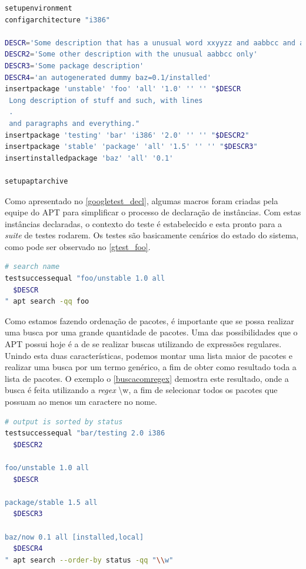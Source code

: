 \begin{lstlisting}[language=Bash,label=googletest_decl,caption={Declarações de instâncias para o teste}]
setupenvironment
configarchitecture "i386"

DESCR='Some description that has a unusual word xxyyzz and aabbcc and a UPPERCASE'
DESCR2='Some other description with the unusual aabbcc only'
DESCR3='Some package description'
DESCR4='an autogenerated dummy baz=0.1/installed'
insertpackage 'unstable' 'foo' 'all' '1.0' '' '' "$DESCR
 Long description of stuff and such, with lines
 .
 and paragraphs and everything."
insertpackage 'testing' 'bar' 'i386' '2.0' '' '' "$DESCR2"
insertpackage 'stable' 'package' 'all' '1.5' '' '' "$DESCR3"
insertinstalledpackage 'baz' 'all' '0.1'

setupaptarchive
\end{lstlisting}

Como apresentado no \autoref{googletest_decl}, algumas macros foram criadas pela equipe do {\code APT} para simplificar o processo de declaração de instâncias. Com estas instâncias declaradas, o contexto do teste é estabelecido e esta pronto para a \textit{suite} de testes rodarem. Os testes são basicamente cenários do estado do sistema, como pode ser observado no \autoref{gtest_foo}.

\begin{lstlisting}[language=Bash,label=gtest_foo,caption={Teste por busca pelo pacote \textit{foo}}]
# search name
testsuccessequal "foo/unstable 1.0 all
  $DESCR
" apt search -qq foo
\end{lstlisting}

Como estamos fazendo ordenação de pacotes, é importante que se possa realizar uma busca por uma grande quantidade de pacotes. Uma das possibilidades que o {\code APT} possui hoje é a de se realizar buscas utilizando de expressões regulares. Unindo esta duas características, podemos montar uma lista maior de pacotes e realizar uma busca por um termo genérico, a fim de obter como resultado toda a lista de pacotes. O exemplo o \autoref{buscacomregex} demostra este resultado, onde a busca é feita utilizando a \textit{regex} {\code \textbackslash w}, a fim de selecionar todos os pacotes que possuam ao menos um caractere no nome.

\begin{lstlisting}[language=Bash,label=buscacomregex,caption={Busca com uso de expressão regular}]
# output is sorted by status
testsuccessequal "bar/testing 2.0 i386
  $DESCR2

foo/unstable 1.0 all
  $DESCR

package/stable 1.5 all
  $DESCR3

baz/now 0.1 all [installed,local]
  $DESCR4
" apt search --order-by status -qq "\\w"
\end{lstlisting}

